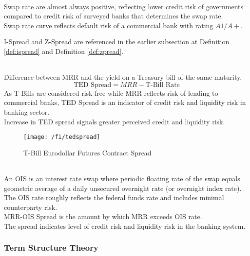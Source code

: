 \begin{remark} \\
Swap rate are almost always positive, reflecting lower credit risk of governments compared to credit risk of surveyed banks that determines the swap rate.\\
Swap rate curve reflects default risk of a commercial bank with rating $A1/A+$.
\end{remark}

I-Spread and Z-Spread are referenced in the earlier subsection at Definition \ref{def:ispread} and Definition \ref{def:zpread}.

\begin{definition} \\
Difference between MRR and the yield on a Treasury bill of the same maturity.
\begin{equation}
\text{TED Spread} = MRR - \text{T-Bill Rate} \nonumber
\end{equation}
As T-Bills are considered risk-free while MRR reflects risk of lending to commercial banks, TED Spread is an indicator of credit risk and liquidity risk in banking sector.\\
Increase in TED spread signals greater perceived credit and liquidity risk.
\end{definition}

\begin{figure}[H]
\centering
\texttt{[image: /fi/tedspread]}
\caption{T-Bill Eurodollar Futures Contract Spread}
\end{figure}

\begin{definition} \\
An OIS is an interest rate swap where periodic floating rate of the swap equals geometric average of a daily unsecured overnight rate (or overnight index rate).\\
The OIS rate roughly reflects the federal funds rate and includes minimal counterparty risk.\\
MRR-OIS Spread is the amount by which MRR exceeds OIS rate.\\
The spread indicates level of credit risk and liquidity risk in the banking system.
\end{definition}

\subsubsection{Term Structure Theory}

